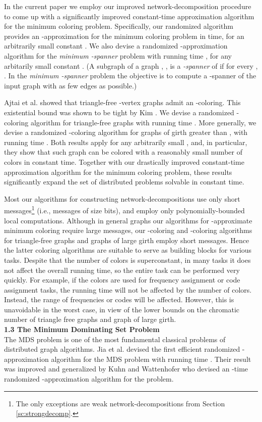 \documentclass[11pt]{article}
\begin{document}
In the current paper we employ our improved network-decomposition procedure to come up with a significantly improved constant-time approximation algorithm for the minimum coloring problem. Specifically, our randomized algorithm provides an -approximation for the minimum coloring problem  in  time, for an arbitrarily small constant .  We also devise a randomized -approximation algorithm for the {\em minimum -spanner} problem with running time , for any arbitarily small constant . (A subgraph  of a graph , , is a {\em -spanner} of  if for every , . In the {\em minimum -spanner} problem the objective is to compute a -spanner of the input graph   with as few edges as possible.)

Ajtai et al. \cite{AKS80} showed that triangle-free -vertex graphs admit an -coloring. This existential bound was shown to be tight by Kim \cite{K95}. We devise a randomized -coloring algorithm for triangle-free graphs with running time . More generally, we devise a randomized -coloring algorithm for graphs of girth greater than , with running time . Both results apply for any arbitrarily small , and, in particular, they show that such graph can be colored with a reasonably small number of colors in constant time. Together with our drastically improved constant-time approximation algorithm for the minimum coloring problem, these results significantly expand the set of distributed problems solvable in constant time. 

Most our algorithms for constructing network-decompositions use only short messages\footnote[1]{The only exceptions are weak network-decompositions from Section \ref{sc:strongdecomp}.} (i.e., messages of size  bits), and employ only polynomially-bounded local computations. Although in general graphs our algorithms for -approximate minimum coloring require large messages, our -coloring and -coloring algorithms for triangle-free graphs and graphs of large girth employ short messages.  Hence the latter coloring algorithms are suitable to serve as building blocks for various tasks. Despite that the number of colors is superconstant, in many tasks it does not affect the overall running time, so the entire task can be performed very quickly. For example, if the colors are used for frequency assignment or code assignment tasks, the running time will not be affected by the number of colors. Instead, the range of frequencies or codes will be affected. However, this is unavoidable in the worst case, in view of the lower bounds on the chromatic number of triangle free graphs and graph of large girth.\\
{\bf 1.3 The Minimum Dominating Set Problem\\}
The MDS problem is one of the most fundamental classical problems of distributed graph algorithms. Jia et al. \cite{JRS01} devised the first efficient randomized -approximation algorithm for the MDS problem with running time . Their result was improved and generalized by Kuhn and Wattenhofer \cite{KW05} who devised an -time randomized -approximation algorithm for the problem.
\end{document}

